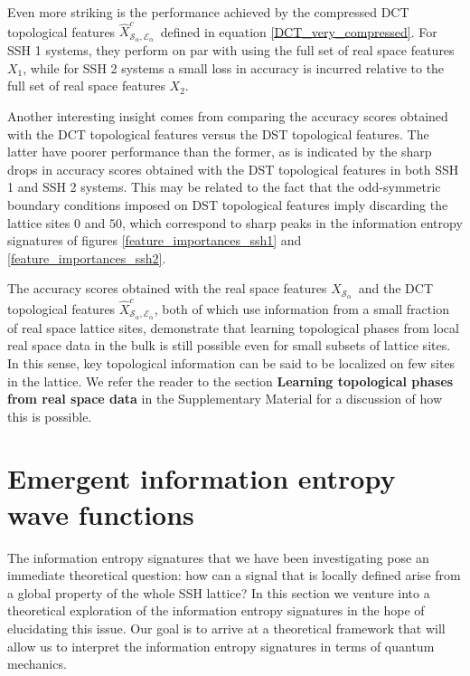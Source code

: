 \documentclass[10pt]{revtex4-1}
\newcommand\xSalpha{$X_{\mathcal{S}_\alpha}$}
\newcommand\xcSEalpha{$\hat{X}^c_{\mathcal{S}_\alpha,\mathcal{E}_\alpha}$}
\newcommand\xOne{$X_1$}
\newcommand\xTwo{$X_2$}
\begin{document}
Even more striking is the performance achieved by the compressed DCT topological features \xcSEalpha\ defined in equation \eqref{DCT_very_compressed}. For SSH 1 systems, they perform on par with using the full set of real space features \xOne, while for SSH 2 systems a small loss in accuracy is incurred relative to the full set of real space features \xTwo.

Another interesting insight comes from comparing the accuracy scores obtained with the DCT topological features versus the  DST topological features. The latter have poorer performance than the former, as is indicated by the sharp drops in accuracy scores obtained with the DST topological features in both SSH 1 and SSH 2 systems. This may be related to the fact that the odd-symmetric boundary conditions imposed on DST topological features imply discarding the lattice sites 0 and $50$, which correspond to sharp peaks in the information entropy signatures of figures \ref{feature_importances_ssh1} and \ref{feature_importances_ssh2}.  

The accuracy scores obtained with the real space features \xSalpha\ and the DCT topological features \xcSEalpha, both of which use information from a small fraction of real space lattice sites, demonstrate that learning topological phases from local real space data in the bulk is still possible even for small subsets of lattice sites. In this sense, key topological information can be said to be localized on few sites in the lattice. We refer the reader to the section \textbf{Learning topological phases from real space data} in the Supplementary Material for a discussion of how this is possible.       

\section{Emergent information entropy wave functions}
\label{emergent_information_entropy_wave_functions}

The information entropy signatures that we have been investigating pose an immediate theoretical question: how can a signal that is locally defined arise from a global property of the whole SSH lattice?    
In this section we venture into a theoretical exploration of the information entropy signatures in the hope of elucidating this issue. Our goal is to arrive at a theoretical framework that will allow us to interpret the information entropy signatures in terms of quantum mechanics.  %
\end{document}
